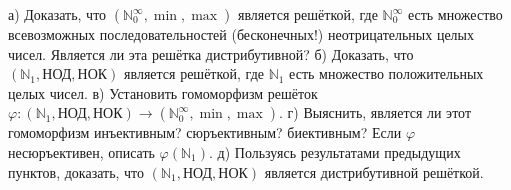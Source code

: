а) Доказать, что $(\mathbb N_0^\infty,\min,\max)$ является решёткой, где $\mathbb N_0^\infty$ есть множество всевозможных последовательностей (бесконечных!) неотрицательных целых чисел. Является ли эта решётка дистрибутивной?
б) Доказать, что $(\mathbb N_1, \mbox{НОД}, \mbox{НОК})$ является решёткой, где $\mathbb N_1$ есть множество положительных целых чисел.
в) Установить гомоморфизм решёток $\varphi:(\mathbb N_1, \mbox{НОД}, \mbox{НОК}) \to (\mathbb N_0^\infty,\min,\max)$.
г) Выяснить, является ли этот гомоморфизм инъективным? сюръективным? биективным? Если $\varphi$ несюръективен, описать $\varphi(\mathbb N_1)$.
д) Пользуясь результатами предыдущих пунктов, доказать, что $(\mathbb N_1, \mbox{НОД}, \mbox{НОК})$ является дистрибутивной решёткой.
